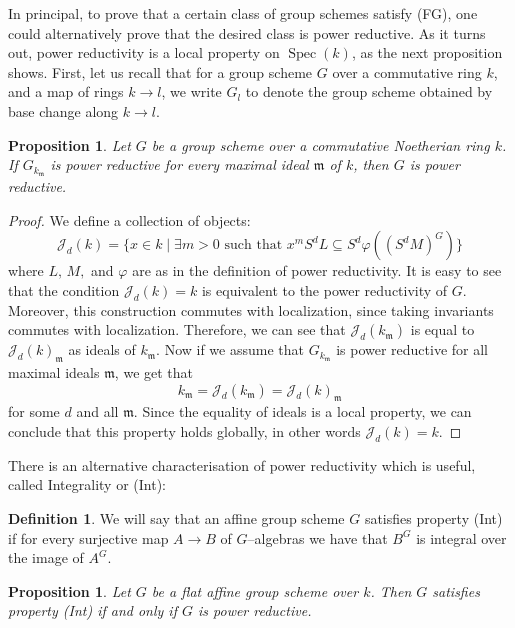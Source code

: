 \documentclass{article}
\theoremstyle{plain}
\newtheorem{Prop}[Th]{Proposition}
\theoremstyle{definition}
\newtheorem{Def}[Th]{Definition}
\DeclareMathOperator{\Spec}{Spec}
\begin{document}
In principal, to prove that a certain class of group schemes satisfy (FG), one could alternatively prove that the desired class is power reductive. As it turns out, power reductivity is a local property on $\Spec(k)$, as the next proposition shows. First, let us recall  that for a group scheme $G$ over a commutative ring $k$, and a map of rings $k\to l$, we write $G_l$ to denote the group scheme obtained by base change along $k\to l$.

\begin{Prop}\label{Power Reductivity is Local}
  Let $G$ be a group scheme over a commutative Noetherian ring $k$.  If $G_{k_{\mathfrak{m}}}$ is power reductive for every maximal ideal $\mathfrak{m}$ of $k$, then $G$ is power reductive. 
\end{Prop}

\begin{proof}
    We define a collection of objects:
    \[\mathcal{J}_d(k)=\{x\in k \mid \exists m>0 \text{ such that } x^mS^dL\subseteq S^d\varphi((S^dM)^G)\}\]
     where $L,\,  M,$ and $\varphi$ are as in the definition of power reductivity. It is easy to see that the condition $\mathcal{J}_d(k)=k$ is equivalent to the power reductivity of $G$. Moreover, this construction commutes with localization, since taking invariants commutes with localization. Therefore, we can see that $\mathcal{J}_d(k_\mathfrak{m})$ is equal to $\mathcal{J}_d(k)_{\mathfrak{m}}$ as ideals of $k_\mathfrak{m}.$ Now if we assume that $G_{k_\mathfrak{m}}$ is power reductive for all maximal ideals $\mathfrak{m}$, we get that 
     \[
     k_\mathfrak{m}=\mathcal{J}_d(k_\mathfrak{m})=\mathcal{J}_d(k)_{\mathfrak{m}}
     \]
     for some $d$ and all $\mathfrak{m}$. Since the equality of ideals is a local property, we can conclude that this property holds globally, in other words $\mathcal{J}_d(k)=k$.
\end{proof}

There is an alternative characterisation of power reductivity which is useful, called Integrality or (Int):



\begin{Def}
    We will say that an affine group scheme $G$ satisfies property (Int) if for every surjective map $A\to B$ of $G$--algebras we have that $B^G$ is integral over the image of $A^G$.
\end{Def}



\begin{Prop}\label{Int iff PR}
    Let $G$ be a flat affine group scheme over $k$. Then $G$ satisfies property (Int) if and only if $G$ is power reductive.
\end{Prop}
\end{document}
